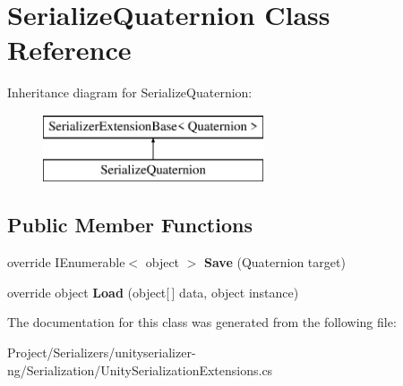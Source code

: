 \hypertarget{class_serialize_quaternion}{}\section{Serialize\+Quaternion Class Reference}
\label{class_serialize_quaternion}
Inheritance diagram for Serialize\+Quaternion\+:\begin{figure}[H]
\begin{center}
\leavevmode
\includegraphics[height=2.000000cm]{class_serialize_quaternion}
\end{center}
\end{figure}
\subsection*{Public Member Functions}
\begin{DoxyCompactItemize}
\item 
\mbox{\label{class_serialize_quaternion_aac8d597d978662eb8943fc54964ba947}} 
override I\+Enumerable$<$ object $>$ {\bfseries Save} (Quaternion target)
\item 
\mbox{\label{class_serialize_quaternion_a0c239eb6d19dd934bdcc7beca614e316}} 
override object {\bfseries Load} (object\mbox{[}$\,$\mbox{]} data, object instance)
\end{DoxyCompactItemize}


The documentation for this class was generated from the following file\+:\begin{DoxyCompactItemize}
\item 
Project/\+Serializers/unityserializer-\/ng/\+Serialization/Unity\+Serialization\+Extensions.\+cs\end{DoxyCompactItemize}
